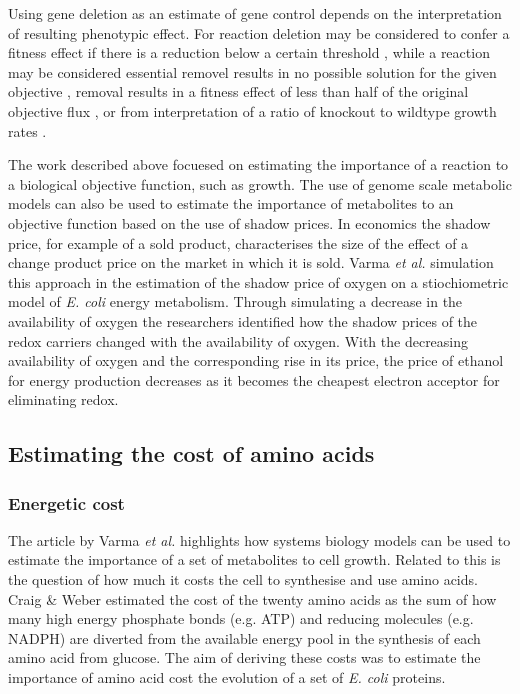 Using gene deletion as an estimate of gene control depends on the interpretation of resulting phenotypic effect. For reaction deletion may be considered to confer a fitness effect if there is a reduction below a certain threshold \cite{pal2006}, while a reaction may be considered essential removel results in no possible solution for the given objective \cite{becker2008}, removal results in a fitness effect of less than half of the original objective flux \cite{papp2004}, or from interpretation of a ratio of knockout to wildtype growth rates \cite{wang2009}.

The work described above focuesed on estimating the importance of a reaction to a biological objective function, such as growth. The use of genome scale metabolic models can also be used to estimate the importance of metabolites to an objective function based on the use of shadow prices. In economics the shadow price, for example of a sold product, characterises the size of the  effect of a change product price on the market in which it is sold. Varma \emph{et al.} \cite{varma1993} simulation this approach in the estimation of the shadow price of oxygen on a stiochiometric model of \emph{E. coli} energy metabolism. Through simulating a decrease in the availability of oxygen the researchers identified how the shadow prices of the redox carriers changed with the availability of oxygen. With the decreasing availability of oxygen and the corresponding rise in its price, the price of ethanol for energy production decreases as it becomes the cheapest electron acceptor for eliminating redox.

\subsection{Estimating the cost of amino acids}

\subsubsection{Energetic cost}

The article by Varma \emph{et al.} highlights how systems biology models can be used to estimate the importance of a set of metabolites to cell growth. Related to this is the question of how much it costs the cell to synthesise and use amino acids. Craig \& Weber \cite{craig1998} estimated the cost of the twenty amino acids as the sum of how many high energy phosphate bonds (e.g. ATP) and reducing molecules (e.g. NADPH) are diverted from the available energy pool in the synthesis of each amino acid from glucose. The aim of deriving these costs was to estimate the importance of amino acid cost the evolution of a set of \emph{E. coli} proteins.

